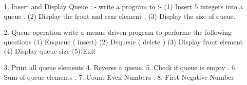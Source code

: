 1. Insert and Display Queue : - 
write a program to :-
(1)  Insert 5 integers into a queue .
(2)  Display the front and rear element .
(3)  Display the size of queue.

2. Queue operation
 write a menue driven program to performe the following questions 
(1)  Enqueue ( insert)
(2)  Dequeue  ( delete )
(3)  Display front element 
(4)  Display queue size 
(5)  Exit 

3. Print all queue elements 
4. Reverse a queue.
5. Check if queue is empty .
6. Sum of queue elements .
7. Count Even Numbers .
8. First Negative Number 







